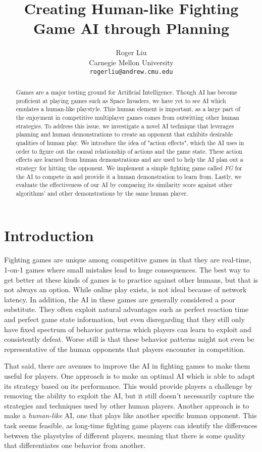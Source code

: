 \documentclass{article}
\title{Creating Human-like Fighting Game AI through Planning}
\author{
  Roger Liu \\
  Carnegie Mellon University \\
  \texttt{rogerliu@andrew.cmu.edu} \\
}
\begin{document}
\maketitle

\begin{abstract}
Games are a major testing ground for Artificial Intelligence. Though AI has become proficient at playing games such as Space Invaders, we have yet to see AI which emulates a human-like playstyle. This human element is important, as a large part of the enjoyment in competitive multiplayer games comes from outwitting other human strategies. To address this issue, we investigate a novel AI technique that leverages planning and human demonstrations to create an opponent that exhibits desirable qualities of human play. We introduce the idea of "action effects", which the AI uses in order to figure out the causal relationship of actions and the game state. These action effects are learned from human demonstrations and are used to help the AI plan out a strategy for hitting the opponent. We implement a simple fighting game called \textit{FG} for the AI to compete in and provide it a human demonstration to learn from. Lastly, we evaluate the effectiveness of our AI by comparing its similarity score against other algorithms' and other demonstrations by the same human player.
\end{abstract}




\section{Introduction}
Fighting games are unique among competitive games in that they are real-time, 1-on-1 games where small mistakes lead to huge consequences. The best way to get better at these kinds of games is to practice against other humans, but that is not always an option. While online play exists, is not ideal because of network latency. In addition, the AI in these games are generally considered a poor substitute. They often exploit natural advantages such as perfect reaction time and perfect game state information, but even disregarding that they still only have fixed spectrum of behavior patterns which players can learn to exploit and consistently defeat. Worse still is that these behavior patterns might not even be representative of the human opponents that players encounter in competition.

That said, there are avenues to improve the AI in fighting games to make them useful for players. One approach is to make an optimal AI which is able to adapt its strategy based on its performance. This would provide players a challenge by removing the ability to exploit the AI, but it still doesn't necessarily capture the strategies and techniques used by other human players. Another approach is to make a \textit{human-like} AI, one that plays like another specific human opponent. This task seems feasible, as long-time fighting game players can identify the differences between the playstyles of different players, meaning that there is some quality that differentiates one behavior from another.
\end{document}
